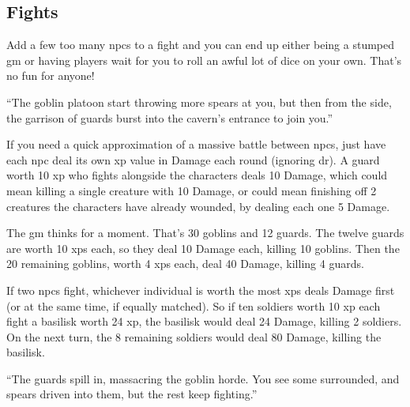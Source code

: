 \begin{multicols}{2}
\subsection{ Fights}
\label{npcfights}

Add a few too many \glspl{npc} to a fight and you can end up either being a stumped \gls{gm} or having players wait for you to roll an awful lot of dice on your own.
That's no fun for anyone!

\begin{exampletext}

  ``The goblin platoon start throwing more spears at you, but then from the side, the garrison of guards burst into the cavern's entrance to join you.''

\end{exampletext}

If you need a quick approximation of a massive battle between \glspl{npc}, just have each \gls{npc} deal its own \gls{xp} value in Damage each round (ignoring \gls{dr}).
A guard worth 10 \gls{xp} who fights alongside the characters deals 10 Damage, which could mean killing a single creature with 10 Damage, or could mean finishing off 2 creatures the characters have already wounded, by dealing each one 5 Damage.

\begin{exampletext}

  The \gls{gm} thinks for a moment.
  That's 30 goblins and 12 guards.
  The twelve guards are worth 10 \glspl{xp} each, so they deal 10 Damage each, killing 10 goblins.
  Then the 20 remaining goblins, worth 4 \glspl{xp} each, deal 40 Damage, killing 4 guards.

\end{exampletext}

If two \glspl{npc} fight, whichever individual is worth the most \glspl{xp} deals Damage first (or at the same time, if equally matched).
So if ten soldiers worth 10 \gls{xp} each fight a basilisk worth 24 \gls{xp}, the basilisk would deal 24 Damage, killing 2 soldiers.
On the next turn, the 8 remaining soldiers would deal 80 Damage, killing the basilisk.

\begin{exampletext}

  ``The guards spill in, massacring the goblin horde.
  You see some surrounded, and spears driven into them, but the rest keep fighting.''

\end{exampletext}


\end{multicols}
